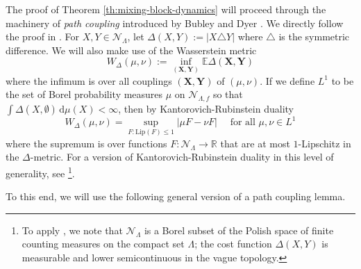 \documentclass[10pt]{amsart}
\theoremstyle{definition}
\theoremstyle{remark}
\newcommand{\pointsets}{\mathcal{N}}
\newcommand{\bX}{\mathbf{X}}
\newcommand{\bY}{\mathbf{Y}}
\newcommand{\E}{\mathbb{E}}
\newcommand{\R}{\mathbb{R}}
\newcommand{\region}{\Lambda}
\newcommand{\diff}{\mathrm{d}}
\begin{document}
	The proof of Theorem \ref{th:mixing-block-dynamics} will proceed through the machinery of \emph{path coupling} introduced by Bubley and Dyer \cite{bubley1997path}.  We directly follow the proof in \cite[Chapter~14]{levin2017markov}.  
	For $X, Y \in \pointsets_{\region}$, let $\Delta(X,Y) := |X \triangle Y|$ where $\triangle$ is the symmetric difference.  We will also make use of the Wasserstein metric \begin{equation}\label{eq:wasserstein-definition}
		W_\Delta(\mu,\nu) := \inf_{(\bX,\bY)} \E \Delta(\bX,\bY)
	\end{equation}
	where the infimum is over all couplings $(\bX,\bY)$ of $(\mu,\nu)$.  
	If we define $L^1$ to be the set of Borel probability measures $\mu$ on $\pointsets_{\Lambda,f}$ so that $\int \Delta(X,\emptyset)\,\diff\mu(X) < \infty$, then by Kantorovich-Rubinstein duality \begin{equation}\label{eq:wasserstein-duality}
		W_\Delta(\mu,\nu) = \sup_{F:\mathrm{Lip}(F) \leq 1}| \mu F - \nu F| \quad \text{ for all } \mu,\nu \in L^1
	\end{equation}
	where the supremum is over functions $F: \pointsets_{\region} \to \R$ that are at most $1$-Lipschitz in the $\Delta$-metric.  
	For a version of Kantorovich-Rubinstein duality in this level of generality, see \cite[Theorem 5.10]{villani2009optimal}\footnote{To apply \cite[Theorem 5.10]{villani2009optimal}, we note that $\pointsets_{\Lambda}$ is a Borel subset of the Polish space of finite counting measures on the compact set $\region$; the cost function $\Delta(X,Y)$ is measurable and lower semicontinuous in the vague topology.}.
	
	
	To this end, we will use the following general version of a path coupling lemma.
	
\end{document}
